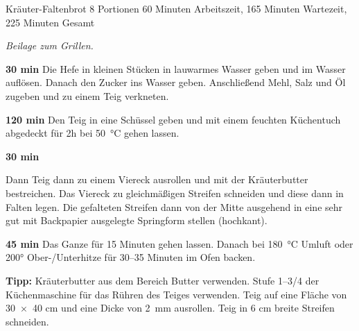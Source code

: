 \begin{recipe}{Kräuter-Faltenbrot} {8 Portionen} {60 Minuten Arbeitszeit, 165 Minuten Wartezeit, 225 Minuten Gesamt}

  \freeform{}\textit{Beilage zum Grillen.}


  \textbf{30 min}
  Die Hefe in kleinen Stücken in lauwarmes Wasser geben und im Wasser auflösen.
  Danach den Zucker ins Wasser geben.
  Anschließend Mehl, Salz und Öl zugeben und zu einem Teig verkneten.

  \newstep{}\textbf{120 min}
  Den Teig in eine Schüssel geben und mit einem feuchten Küchentuch abgedeckt für 2h bei 50 °C gehen lassen.

  \textbf{30 min}
  
  Dann Teig dann zu einem Viereck ausrollen und mit der Kräuterbutter bestreichen.
  Das Viereck zu gleichmäßigen Streifen schneiden und diese dann in Falten legen.
  Die gefalteten Streifen dann von der Mitte ausgehend in eine sehr gut mit Backpapier ausgelegte Springform stellen (hochkant).

  \newstep{}\textbf{45 min}
  Das Ganze für 15 Minuten gehen lassen.
  Danach bei 180 °C Umluft oder 200° Ober-/Unterhitze für 30--35 Minuten im Ofen backen.

  \freeform{}\hrulefill{}

  \freeform{}\textbf{Tipp:}
  Kräuterbutter aus dem Bereich Butter verwenden.
  Stufe 1--3/4 der Küchenmaschine für das Rühren des Teiges verwenden.
  Teig auf eine Fläche von 30 × 40 cm und eine Dicke von 2 mm ausrollen.
  Teig in 6 cm breite Streifen schneiden.

\end{recipe}
